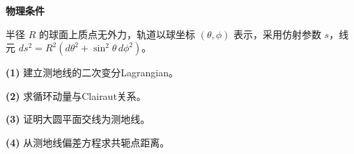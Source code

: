 \textbf{物理条件}\par 半径 \(R\) 的球面上质点无外力，轨道以球坐标 \((\theta,\phi)\) 表示，采用仿射参数 \(s\)，线元 \(ds^2=R^2(d\theta^2+\sin^2\theta\,d\phi^2)\)。
\par\noindent\textbf{(1)} 建立测地线的二次变分Lagrangian。
\par\noindent\textbf{(2)} 求循环动量与Clairaut关系。
\par\noindent\textbf{(3)} 证明大圆平面交线为测地线。
\par\noindent\textbf{(4)} 从测地线偏差方程求共轭点距离。
